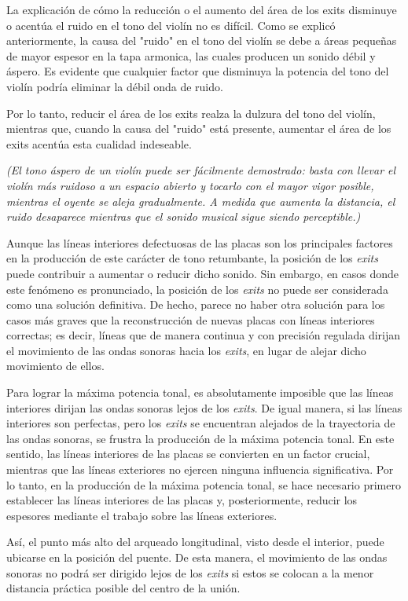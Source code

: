 \documentclass[12pt]{book}
\begin{document}
La explicación de cómo la reducción o el aumento del área de los exits disminuye o acentúa el ruido en el tono del violín no es difícil. Como se explicó anteriormente, la causa del "ruido" en el tono del violín se debe a áreas pequeñas de mayor espesor en la tapa armonica, las cuales producen un sonido débil y áspero. Es evidente que cualquier factor que disminuya la potencia del tono del violín podría eliminar la débil onda de ruido. 

Por lo tanto, reducir el área de los exits realza la dulzura del tono del violín, mientras que, cuando la causa del "ruido" está presente, aumentar el área de los exits acentúa esta cualidad indeseable.

\textit{(El tono áspero de un violín puede ser fácilmente demostrado: basta con llevar el violín más ruidoso a un espacio abierto y tocarlo con el mayor vigor posible, mientras el oyente se aleja gradualmente. A medida que aumenta la distancia, el ruido desaparece mientras que el sonido musical sigue siendo perceptible.)}

Aunque las líneas interiores defectuosas de las placas son los principales factores en la producción de este carácter de tono retumbante, la posición de los \textit{exits} puede contribuir a aumentar o reducir dicho sonido. Sin embargo, en casos donde este fenómeno es pronunciado, la posición de los \textit{exits} no puede ser considerada como una solución definitiva. De hecho, parece no haber otra solución para los casos más graves que la reconstrucción de nuevas placas con líneas interiores correctas; es decir, líneas que de manera continua y con precisión regulada dirijan el movimiento de las ondas sonoras hacia los \textit{exits}, en lugar de alejar dicho movimiento de ellos.

Para lograr la máxima potencia tonal, es absolutamente imposible que las líneas interiores dirijan las ondas sonoras lejos de los \textit{exits}. De igual manera, si las líneas interiores son perfectas, pero los \textit{exits} se encuentran alejados de la trayectoria de las ondas sonoras, se frustra la producción de la máxima potencia tonal. En este sentido, las líneas interiores de las placas se convierten en un factor crucial, mientras que las líneas exteriores no ejercen ninguna influencia significativa. Por lo tanto, en la producción de la máxima potencia tonal, se hace necesario primero establecer las líneas interiores de las placas y, posteriormente, reducir los espesores mediante el trabajo sobre las líneas exteriores.

Así, el punto más alto del arqueado longitudinal, visto desde el interior, puede ubicarse en la posición del puente. De esta manera, el movimiento de las ondas sonoras no podrá ser dirigido lejos de los \textit{exits} si estos se colocan a la menor distancia práctica posible del centro de la unión.
\end{document}
